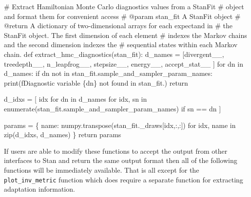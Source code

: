 \documentclass[
  letterpaper,
  DIV=11,
  numbers=noendperiod]{scrartcl}
\newenvironment{Shaded}{\begin{snugshade}}{\end{snugshade}}
\newcommand{\BuiltInTok}[1]{\textcolor[rgb]{0.00,0.23,0.31}{#1}}
\newcommand{\CommentTok}[1]{\textcolor[rgb]{0.37,0.37,0.37}{#1}}
\newcommand{\ControlFlowTok}[1]{\textcolor[rgb]{0.00,0.23,0.31}{#1}}
\newcommand{\KeywordTok}[1]{\textcolor[rgb]{0.00,0.23,0.31}{#1}}
\newcommand{\NormalTok}[1]{\textcolor[rgb]{0.00,0.23,0.31}{#1}}
\newcommand{\OperatorTok}[1]{\textcolor[rgb]{0.37,0.37,0.37}{#1}}
\newcommand{\SpecialCharTok}[1]{\textcolor[rgb]{0.37,0.37,0.37}{#1}}
\newcommand{\SpecialStringTok}[1]{\textcolor[rgb]{0.13,0.47,0.30}{#1}}
\newcommand{\StringTok}[1]{\textcolor[rgb]{0.13,0.47,0.30}{#1}}
\begin{document}
\begin{Shaded}
\begin{Highlighting}[]
\CommentTok{\# Extract Hamiltonian Monte Carlo diagnostics values from a StanFit}
\CommentTok{\# object and format them for convenient access}
\CommentTok{\# @param stan\_fit A StanFit object}
\CommentTok{\# @return A dictionary of two{-}dimensional arrays for each expectand in}
\CommentTok{\#         the StanFit object.  The first dimension of each element}
\CommentTok{\#         indexes the Markov chains and the second dimension indexes the}
\CommentTok{\#         sequential states within each Markov chain.}
\KeywordTok{def}\NormalTok{ extract\_hmc\_diagnostics(stan\_fit):}
\NormalTok{  d\_names }\OperatorTok{=}\NormalTok{ [}\StringTok{\textquotesingle{}divergent\_\_\textquotesingle{}}\NormalTok{, }\StringTok{\textquotesingle{}treedepth\_\_\textquotesingle{}}\NormalTok{, }\StringTok{\textquotesingle{}n\_leapfrog\_\_\textquotesingle{}}\NormalTok{,}
             \StringTok{\textquotesingle{}stepsize\_\_\textquotesingle{}}\NormalTok{, }\StringTok{\textquotesingle{}energy\_\_\textquotesingle{}}\NormalTok{, }\StringTok{\textquotesingle{}accept\_stat\_\_\textquotesingle{}}\NormalTok{ ]}
  \ControlFlowTok{for}\NormalTok{ dn }\KeywordTok{in}\NormalTok{ d\_names:}
    \ControlFlowTok{if}\NormalTok{ dn }\KeywordTok{not} \KeywordTok{in}\NormalTok{ stan\_fit.sample\_and\_sampler\_param\_names:}
      \BuiltInTok{print}\NormalTok{(}\SpecialStringTok{f\textquotesingle{}Diagnostic variable }\SpecialCharTok{\{}\NormalTok{dn}\SpecialCharTok{\}}\SpecialStringTok{ not found in stan\_fit.\textquotesingle{}}\NormalTok{)}
      \ControlFlowTok{return}

\NormalTok{  d\_idxs }\OperatorTok{=}\NormalTok{ [ idx }\ControlFlowTok{for}\NormalTok{ dn }\KeywordTok{in}\NormalTok{ d\_names}
             \ControlFlowTok{for}\NormalTok{ idx, sn}
             \KeywordTok{in} \BuiltInTok{enumerate}\NormalTok{(stan\_fit.sample\_and\_sampler\_param\_names)}
             \ControlFlowTok{if}\NormalTok{ sn }\OperatorTok{==}\NormalTok{ dn ]}
  
\NormalTok{  params }\OperatorTok{=}\NormalTok{ \{ name: numpy.transpose(stan\_fit.\_draws[idx,:,:])}
           \ControlFlowTok{for}\NormalTok{ idx, name }\KeywordTok{in} \BuiltInTok{zip}\NormalTok{(d\_idxs, d\_names) \}}
  \ControlFlowTok{return}\NormalTok{ params}
\end{Highlighting}
\end{Shaded}

If users are able to modify these functions to accept the output from
other interfaces to Stan and return the same output format then all of
the following functions will be immediately available. That is all
except for the \texttt{plot\_inv\_metric} function which does require a
separate function for extracting adaptation information.
\end{document}
